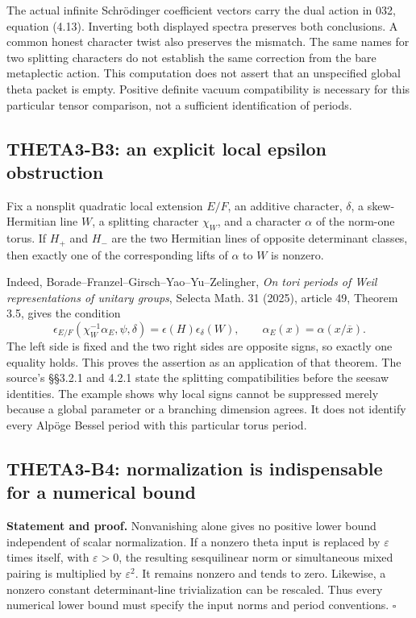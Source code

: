The actual infinite Schr\"odinger coefficient vectors carry the dual action in 032, equation (4.13). Inverting both displayed spectra preserves both conclusions. A common honest character twist also preserves the mismatch. The same names for two splitting characters do not establish the same correction from the bare metaplectic action. This computation does not assert that an unspecified global theta packet is empty. Positive definite vacuum compatibility is necessary for this particular tensor comparison, not a sufficient identification of periods.

\subsection{THETA3-B3: an explicit local epsilon obstruction}\label{B3}

Fix a nonsplit quadratic local extension $E/F$, an additive character, $\delta$, a skew-Hermitian line $W$, a splitting character $\chi_W$, and a character $\alpha$ of the norm-one torus. If $H_+$ and $H_-$ are the two Hermitian lines of opposite determinant classes, then exactly one of the corresponding lifts of $\alpha$ to $W$ is nonzero.

Indeed, Borade--Franzel--Girsch--Yao--Yu--Zelingher, \emph{On tori periods of Weil representations of unitary groups}, Selecta Math. 31 (2025), article 49, Theorem 3.5, gives the condition
\[
 \epsilon_{E/F}(\chi_W^{-1}\alpha_E,\psi,\delta)
       =\epsilon(H)\epsilon_\delta(W),
 \qquad \alpha_E(x)=\alpha(x/\overline x).
\]
The left side is fixed and the two right sides are opposite signs, so exactly one equality holds. This proves the assertion as an application of that theorem. The source's \S\S3.2.1 and 4.2.1 state the splitting compatibilities before the seesaw identities. The example shows why local signs cannot be suppressed merely because a global parameter or a branching dimension agrees. It does not identify every Alp\"oge Bessel period with this particular torus period.

\subsection{THETA3-B4: normalization is indispensable for a numerical bound}\label{B4}

\textbf{Statement and proof.} Nonvanishing alone gives no positive lower bound independent of scalar normalization. If a nonzero theta input is replaced by $\varepsilon$ times itself, with $\varepsilon>0$, the resulting sesquilinear norm or simultaneous mixed pairing is multiplied by $\varepsilon^2$. It remains nonzero and tends to zero. Likewise, a nonzero constant determinant-line trivialization can be rescaled. Thus every numerical lower bound must specify the input norms and period conventions. \hfill$\square$

